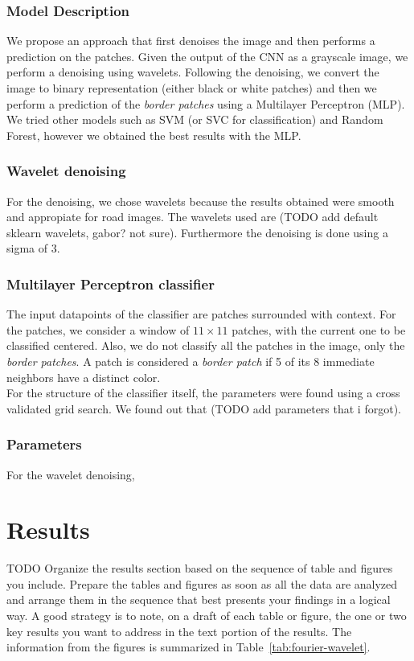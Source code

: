 \documentclass[10pt,conference,compsocconf]{IEEEtran}
\begin{document}
\subsubsection{Model Description}
We propose an approach that first denoises the image and then performs a prediction on the patches. Given the output of the CNN as a grayscale image, we perform a denoising using wavelets. Following the denoising, we convert the image to binary representation (either black or white patches) and then we perform a prediction of the \textit{border patches} using a Multilayer Perceptron (MLP). We tried other models such as SVM (or SVC for classification) and Random Forest, however we obtained the best results with the MLP.
\subsubsection{Wavelet denoising}
For the denoising, we chose wavelets because the results obtained were smooth and appropiate for road images. The wavelets used are (TODO add default sklearn wavelets, gabor? not sure). Furthermore the denoising is done using a sigma of 3. 
\subsubsection{Multilayer Perceptron classifier}
The input datapoints of the classifier are patches surrounded with context. For the patches, we consider a window of $11\times11$ patches, with the current one to be classified centered. Also, we do not classify all the patches in the image, only the \textit{border patches}. A patch is considered a \textit{border patch} if 5 of its 8 immediate neighbors have a distinct color.\\
For the structure of the classifier itself, the parameters were found using a cross validated grid search. We found out that (TODO add parameters that i forgot).
\subsubsection{Parameters}
For the wavelet denoising, 


\section{Results}
\label{sec:results}

TODO
Organize the results section based on the sequence of table and
figures you include. Prepare the tables and figures as soon as all
the data are analyzed and arrange them in the sequence that best
presents your findings in a logical way. A good strategy is to note,
on a draft of each table or figure, the one or two key results you
want to address in the text portion of the results.
The information from the figures is
summarized in Table~\ref{tab:fourier-wavelet}.
\end{document}
